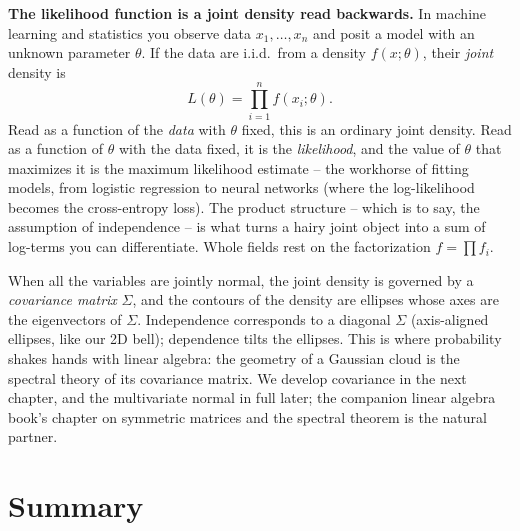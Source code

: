 \begin{applicationbox}
\textbf{The likelihood function is a joint density read backwards.} In machine
learning and statistics you observe data $x_1,\dots,x_n$ and posit a model with
an unknown parameter $\theta$. If the data are i.i.d.\ from a density
$f(x;\theta)$, their \emph{joint} density is
\[
  L(\theta) = \prod_{i=1}^{n} f(x_i;\theta).
\]
Read as a function of the \emph{data} with $\theta$ fixed, this is an ordinary
joint density. Read as a function of $\theta$ with the data fixed, it is the
\emph{likelihood}, and the value of $\theta$ that maximizes it is the maximum
likelihood estimate -- the workhorse of fitting models, from logistic regression
to neural networks (where the log-likelihood becomes the cross-entropy loss). The
product structure -- which is to say, the assumption of independence -- is what
turns a hairy joint object into a sum of log-terms you can differentiate. Whole
fields rest on the factorization $f=\prod f_i$.
\end{applicationbox}

\begin{connectionbox}
When all the variables are jointly normal, the joint density is governed by a
\emph{covariance matrix} $\Sigma$, and the contours of the density are ellipses
whose axes are the eigenvectors of $\Sigma$. Independence corresponds to a
diagonal $\Sigma$ (axis-aligned ellipses, like our 2D bell); dependence tilts the
ellipses. This is where probability shakes hands with linear algebra: the
geometry of a Gaussian cloud is the spectral theory of its covariance matrix.
We develop covariance in the next chapter, and the multivariate normal in full
later; the companion linear algebra book's chapter on symmetric matrices and the
spectral theorem is the natural partner.
\end{connectionbox}

\section{Summary}
\label{ch13:summary}

